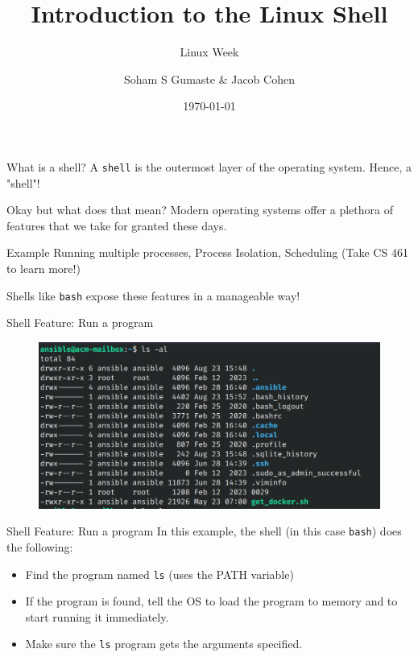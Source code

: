 \documentclass{beamer}
\title{Introduction to the Linux Shell}
\subtitle{Linux Week \the\year{}}
\author{Soham S Gumaste \& Jacob Cohen}
\date{\today}
\institute{Linux Users Group @ UIC}
\begin{document}
\begin{frame}
	\titlepage
\end{frame}

\begin{frame}{What is a shell?}
	A \texttt{shell} is the outermost layer of the operating system. Hence,
	a "shell"!
\end{frame}

\begin{frame}{Okay but what does that mean?}
	Modern operating systems offer a plethora of features that we take for
	granted these days.
	
	\pause

	\begin{exampleblock}{Example}
		Running multiple processes, Process Isolation, Scheduling (Take
		CS 461 to learn more!)
	\end{exampleblock}

	\pause

	Shells like \texttt{bash} expose these features in a manageable way!
\end{frame}

\begin{frame}{Shell Feature: Run a program}
	\begin{figure}
		\centering
		\includegraphics[width=\textwidth]{example.png}
	\end{figure}
\end{frame}

\begin{frame}{Shell Feature: Run a program}
	In this example, the shell (in this case \texttt{bash}) does the
	following:
	\pause
	\begin{itemize}
		\item Find the program named \texttt{ls} (uses the PATH variable)
			\pause
		\item If the program is found, tell the OS to load the program
			to memory and to start running it immediately.
			\pause
		\item Make sure the \texttt{ls} program gets the arguments
			specified.
	\end{itemize}
\end{frame}
\end{document}
